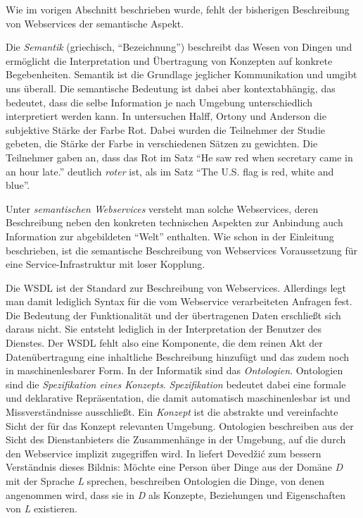 Wie im vorigen Abschnitt beschrieben wurde, fehlt der bisherigen Beschreibung von Webservices der semantische Aspekt.

\bigskip

Die \emph{Semantik} (griechisch, "`Bezeichnung"') beschreibt das Wesen von Dingen und ermöglicht die Interpretation und Übertragung von Konzepten auf konkrete Begebenheiten. Semantik ist die Grundlage jeglicher Kommunikation und umgibt uns überall. Die semantische Bedeutung ist dabei aber kontextabhängig, das bedeutet, dass die selbe Information je nach Umgebung unterschiedlich interpretiert werden kann. In \cite[S.381]{springerlink:10.3758/BF03213193} untersuchen Halff, Ortony und Anderson die subjektive Stärke der Farbe Rot. Dabei wurden die Teilnehmer der Studie gebeten, die Stärke der Farbe in verschiedenen Sätzen zu gewichten. Die Teilnehmer gaben an, dass das Rot im Satz "`He saw red when secretary came in an hour late."' deutlich \emph{roter} ist, als im Satz "`The U.S. flag is red, white and blue"'.

Unter \emph{semantischen Webservices} versteht man solche Webservices, deren Beschreibung neben den konkreten technischen Aspekten zur Anbindung auch Information zur abgebildeten "`Welt"' enthalten. Wie schon in der Einleitung beschrieben, ist die semantische Beschreibung von Webservices Voraussetzung für eine Service-Infrastruktur mit loser Kopplung.

Die \ac{WSDL} ist der Standard zur Beschreibung von Webservices. Allerdings legt man damit lediglich Syntax für die vom Webservice verarbeiteten Anfragen fest. Die Bedeutung der Funktionalität und der übertragenen Daten erschließt sich daraus nicht. Sie entsteht lediglich in der Interpretation der Benutzer des Dienstes. Der \ac{WSDL} fehlt also eine Komponente, die dem reinen Akt der Datenübertragung eine inhaltliche Beschreibung hinzufügt und das zudem noch in maschinenlesbarer Form. In der Informatik sind das \emph{Ontologien}. Ontologien sind die \emph{Spezifikation eines Konzepts}. \emph{Spezifikation} bedeutet dabei eine formale und deklarative Repräsentation, die damit automatisch maschinenlesbar ist und Missverständnisse ausschließt. Ein \emph{Konzept} ist die abstrakte und vereinfachte Sicht der für das Konzept relevanten Umgebung. Ontologien beschreiben aus der Sicht des Dienstanbieters die Zusammenhänge in der Umgebung, auf die durch den Webservice implizit zugegriffen wird. In \cite[S.31]{dcswe} liefert Devedžić zum bessern Verständnis dieses Bildnis: Möchte eine Person über Dinge aus der Domäne \emph{D} mit der Sprache \emph{L} sprechen, beschreiben Ontologien die Dinge, von denen angenommen wird, dass sie in \emph{D} als Konzepte, Beziehungen und Eigenschaften von \emph{L} existieren.

